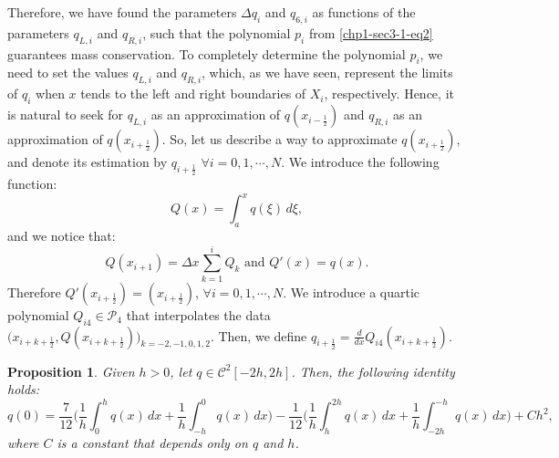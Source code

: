 Therefore, we have found the parameters $\Delta q_i$ and $q_{6, i}$ as
functions of the parameters $q_{L, i}$ and $q_{R, i}$,
such that the polynomial $p_i$ from \eqref{chp1-sec3-1-eq2} 
guarantees mass conservation. To completely determine the 
polynomial $p_i$, we need to set the values $q_{L, i}$ and
$q_{R, i}$, which, as we have seen, represent the limits of $q_i$ when
$x$ tends to the left and right boundaries of $X_i$, respectively.
Hence, it is natural to seek for $q_{L, i}$ as an approximation of $q(x_{i-\frac{1}{2}})$
and $q_{R, i}$ as an approximation of $q(x_{i+\frac{1}{2}})$.
So, let us describe a way to approximate $q(x_{i+\frac{1}{2}})$, and denote its estimation by
$q_{i+\frac{1}{2}}$ $\forall i = 0, 1, \cdots, N$.
We introduce the following function:
\begin{equation}
        \label{chp1-sec3-1-eq6}
	Q(x) = \int_{a}^{x} q(\xi) \,d\xi,
\end{equation}
and we notice that:
\begin{equation}
	Q(x_{i+1}) = \Delta x \sum_{k=1}^{i} Q_k \text{ and } Q'(x) = q(x).
\end{equation}
Therefore $Q'(x_{i+\frac{1}{2}}) = (x_{i+\frac{1}{2}}) $, $\forall i = 0, 1, \cdots, N$.
We introduce a quartic polynomial $Q_{i4} \in \mathcal{P}_4$ that interpolates the data
$\big(x_{i+k+\frac{1}{2}}, Q(x_{i+k+\frac{1}{2}})\big)_{k=-2,-1,0,1,2}$. Then, we define
$q_{i+\frac{1}{2}} = \frac{d}{dx}Q_{i4}(x_{i+k+\frac{1}{2}})$.


\theoremstyle{plain} %
\newtheorem{lema}{Lemma}[chapter]


\theoremstyle{plain} %
\newtheorem{prop}{Proposition}[chapter]

\begin{prop}
	\label{prop:bound1}
	Given $h>0$, let $q \in \mathcal{C}^{2}[-2h,2h]$. Then, the following identity
	holds:
	\begin{equation}
		\label{prop:bound1-eq1}
		q(0) = \frac{7}{12}\bigg( \frac{1}{h} \int_{0}^{h} q(x) \,dx 
		       + \frac{1}{h} \int_{-h}^{0} q(x) \,dx  \bigg)
		       - \frac{1}{12}\bigg( \frac{1}{h} \int_{h}^{2h} q(x) \,dx 
		       + \frac{1}{h} \int_{-2h}^{-h} q(x) \,dx  \bigg) + Ch^2,
	\end{equation}
	where $C$ is a constant that depends only on $q$ and $h$.
\end{prop}

